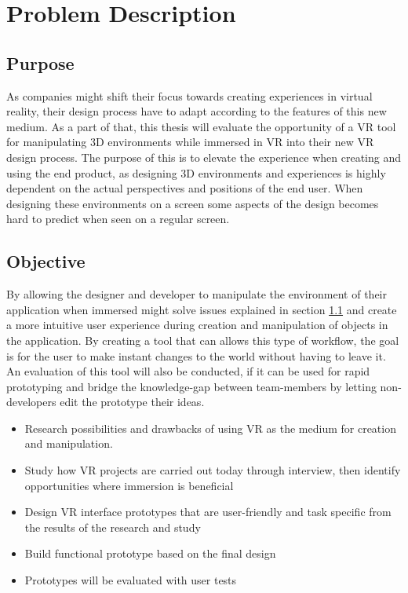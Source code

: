 \section{Problem Description}

\subsection{Purpose}
\label{intro:purpose}
As companies might shift their focus towards creating experiences in virtual reality, their design process have to adapt according to the features of this new medium. As a part of that, this thesis will evaluate the opportunity of a VR tool for manipulating 3D environments while immersed in VR into their new VR design process. The purpose of this is to elevate the experience when creating and using the end product, as designing 3D environments and experiences is highly dependent on the actual perspectives and positions of the end user. When designing these environments on a screen some aspects of the design becomes hard to predict when seen on a regular screen.

\subsection{Objective}
By allowing the designer and developer to manipulate the environment of their application when immersed might solve issues explained in section \ref{intro:purpose} and create a more intuitive user experience during creation and manipulation of objects in the application. By creating a tool that can allows this type of workflow, the goal is for the user to make instant changes to the world without having to leave it. An evaluation of this tool will also be conducted, if it can be used for rapid prototyping and bridge the knowledge-gap between team-members by letting non-developers edit the prototype their ideas.


\begin{itemize}
	\item Research possibilities and drawbacks of using VR as the medium for creation and manipulation.
	\item Study how VR projects are carried out today through interview, then identify opportunities where immersion is beneficial
	\item Design VR interface prototypes that are user-friendly and task specific from the results of the research and study
	\item Build functional prototype based on the final design
	\item Prototypes will be evaluated with user tests
\end{itemize}

